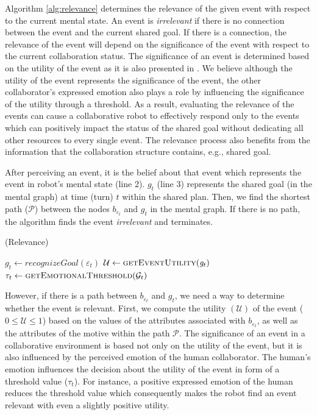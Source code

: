 \documentclass{aamas2016}
\begin{document}
Algorithm \ref{alg:relevance} determines the relevance of the given event with
respect to the current mental state. An event is \textit{irrelevant} if there is
no connection between the event and the current shared goal. If there is a
connection, the relevance of the event will depend on the significance of the
event with respect to the current collaboration status. The significance of an
event is determined based on the utility of the event as it is also presented in
\cite{gratch:domain-independent,marsella:ema-process-model}. We believe although
the utility of the event represents the significance of the event, the other
collaborator's expressed emotion also plays a role by influencing the
significance of the utility through a threshold. As a result, evaluating the
relevance of the events can cause a collaborative robot to effectively respond
only to the events which can positively impact the status of the shared goal
without dedicating all other resources to every single event. The relevance
process also benefits from the information that the collaboration structure
contains, e.g., shared goal.

After perceiving an event, it is the belief about that event which represents
the event in robot's mental state (line 2). $g_{t}$ (line 3) represents the
shared goal (in the mental graph) at time (turn) $t$ within the shared plan.
Then, we find the shortest path ($\mathcal{P}$) between the nodes
$\mathit{b}_{\varepsilon_t}$ and $g_{t}$ in the mental graph. If there is no
path, the algorithm finds the event \textit{irrelevant} and terminates.

\begin{algorithm}
	\caption{(Relevance)}
	\label{alg:relevance}
	\begin{algorithmic}[1]
			\Statex
			\State $\mathit{g}_{t} \gets \textit{recognizeGoal}{(\varepsilon_t)}$
			\Statex
			\State $\mathcal{U} \gets \Call{getEventUtility}{\mathit{g}_{t}}$ 
			\State $\tau_{t} \gets \Call{getEmotionalThreshold}{\mathcal{G}_{t}}$
			\Statex
				\State {}
			\Else
				\State {}
			\EndIf
		\EndFunction
	\end{algorithmic}
\end{algorithm}

However, if there is a path between $\mathit{b}_{\varepsilon_t}$ and $g_{t}$, we
need a way to determine whether the event is relevant. First, we compute the
utility $(\mathcal{U})$ of the event ($0 \leq \mathcal{U} \leq 1$)
based on the values of the attributes associated with
$\mathit{b}_{\varepsilon_t}$, as well as the attributes of the motive within the
path $\mathcal{P}$. The significance of an event in a collaborative environment
is based not only on the utility of the event, but it is also influenced by the
perceived emotion of the human collaborator. The human's emotion influences the
decision about the utility of the event in form of a threshold value
($\tau_{t}$). For instance, a positive expressed emotion of the human reduces
the threshold value which consequently makes the robot find an event relevant
with even a slightly positive utility.
\end{document}
